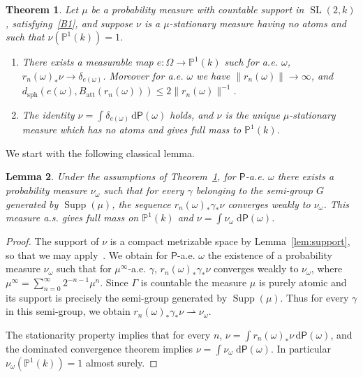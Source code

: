 \documentclass[10pt]{amsart}
\newtheorem{theo}{Theorem}[section]
\newtheorem{lemm}[theo]{Lemma}\newtheorem{prop}[theo]{Proposition}\newtheorem{coro}[theo]{Corollary}\newtheorem{conj}[theo]{Conjecture}
\theoremstyle{definition}\newtheorem{defi}[theo]{Definition}\newtheorem{rema}[theo]{Remark}\newtheorem{exam}[theo]{Example}\newtheorem{exem}[theo]{Example}\newtheorem{nota}[theo]{Notation}
\DeclareMathOperator{\supp}{Supp}
\DeclareMathOperator{\SL}{SL}
\newcommand{\prob}{\mathsf{P}}
\newcommand{\cvf}{\rightharpoonup}
\newcommand{\PP}{\mathbb{P}}
\newcommand{\att}{\mathrm{att}}
\newcommand{\SLk}{\SL(2,k)}
\newcommand*{\dd}{\mathrm{d}}
\newcommand*{\dprob}{\dd \prob}
\begin{document}
\begin{theo}\label{thm:partial unique}
Let $\mu$ be a probability measure with countable support in $\SLk$, satisfying~\eqref{B1}, and suppose $\nu$ is a $\mu$-stationary measure having no atoms and such that $\nu(\PP^1(k)) = 1$.
\begin{enumerate}
\item There exists a measurable map $e: \Omega \to \PP^1(k)$ such for a.e. $\omega$, $r_n(\omega)_* \nu \to \delta_{e(\omega)}$. Moreover for a.e. $\omega$ we have $\|r_n(\omega)\| \to \infty$, and $d_{\mathrm{sph}}(e(\omega), B_\att(r_n(\omega))) \le 2 \|r_n(\omega)\|^{-1}$.
\item The identity $\nu = \int \delta_{e(\omega)} \, \dprob(\omega)$ holds, and $\nu$ is the unique $\mu$-stationary measure which has no atoms and gives full mass to $\PP^1(k)$.
\end{enumerate}
\end{theo}

We start with the following classical lemma.

\begin{lemm}\label{lem:guivarch raugi}
Under the assumptions of Theorem~\ref{thm:partial unique}, for $\prob$-a.e. $\omega$ there exists a probability measure $\nu_\omega$ such that for every $\gamma$ belonging to the semi-group $G$ generated by $\supp(\mu)$, the sequence $r_n(\omega)_*\gamma_*\nu$ converges weakly to $\nu_\omega$. This measure a.s. gives full mass on $\PP^1(k)$ and $\nu = \int \nu_\omega \; \dprob(\omega)$.
\end{lemm}

\begin{proof}
The support of $\nu$ is a compact metrizable space by Lemma~\ref{lem:support}, so that we may apply~\cite[Lem.~2.1, p.~19]{bougerol-lacroix}. We obtain for $\prob$-a.e. $\omega$ the existence of a probability measure $\nu_\omega$ such that for $\mu^\infty$-a.e. $\gamma$, $r_n(\omega)_*\gamma_*\nu$ converges weakly to $\nu_\omega$, where $\mu^\infty = \sum_{n = 0}^\infty 2^{-n-1}\mu^n$. Since $\Gamma$ is countable the measure $\mu$ is purely atomic and its support is precisely the semi-group generated by $\supp(\mu)$. Thus for every $\gamma$ in this semi-group, we obtain $r_n(\omega)_*\gamma_*\nu \cvf \nu_\omega$.

The stationarity property implies that for every $n$, $\nu = \int r_n(\omega)_* \nu\, \dprob(\omega)$, and the dominated convergence theorem implies $\nu = \int \nu_\omega \; \dprob(\omega)$. In particular $\nu_\omega(\PP^1(k)) =1$ almost surely.
\end{proof}
\end{document}
